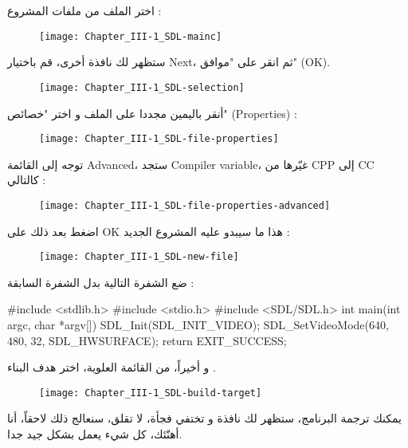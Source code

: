 \begin{tcolorbox}[breakable,title=ملاحظات مترجمة الكتاب, colback=orange!20, colframe=orange!70, fontupper=\footnotesize, coltitle=white, fonttitle=\normalsize, attach title]
اختر الملف
من ملفات المشروع :

\begin{figure}[H]
	\centering
	\texttt{[image: Chapter\_III-1\_SDL-mainc]}
\end{figure}

ستظهر لك نافذة أخرى، قم باختيار
\textenglish{Next}،
ثم انقر على "موافق"
(\textenglish{OK}).

\begin{figure}[H]
	\centering
	\texttt{[image: Chapter\_III-1\_SDL-selection]}
\end{figure}

أنقر باليمين مجددا على الملف 
و اختر "خصائص" 
(\textenglish{Properties}) :

\begin{figure}[H]
	\centering
	\texttt{[image: Chapter\_III-1\_SDL-file-properties]}
\end{figure}

توجه إلى القائمة
\textenglish{Advanced}،
ستجد
\textenglish{Compiler variable}،
غيّرها من
\textenglish{CPP}
إلى
\textenglish{CC}
كالتالي :

\begin{figure}[H]
	\centering
	\texttt{[image: Chapter\_III-1\_SDL-file-properties-advanced]}
\end{figure}

اضغط بعد ذلك على
\textenglish{OK}
هذا ما سيبدو عليه المشروع الجديد :

\begin{figure}[H]
	\centering
	\texttt{[image: Chapter\_III-1\_SDL-new-file]}
\end{figure}

ضع الشفرة التالية بدل الشفرة السابقة :

\begin{Csource}
#include <stdlib.h> 
#include <stdio.h> 
#include <SDL/SDL.h>
int main(int argc, char *argv[]) 
{ 
	SDL_Init(SDL_INIT_VIDEO); 
	SDL_SetVideoMode(640, 480, 32, SDL_HWSURFACE); 
	return EXIT_SUCCESS; 
}
\end{Csource}

و أخيراً، من القائمة العلوية، اختر هدف البناء 
.

\begin{figure}[H]
	\centering
	\texttt{[image: Chapter\_III-1\_SDL-build-target]}
\end{figure}


يمكنك ترجمة البرنامج، ستظهر لك نافذة و تختفي فجأة، لا تقلق، سنعالج ذلك لاحقاً، أنا أهنّئك، كل شيء يعمل بشكل جيد جدا.

\end{tcolorbox}

